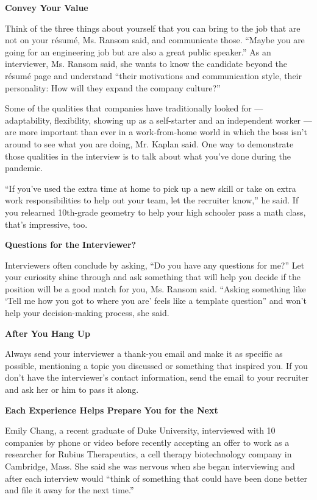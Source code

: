 \textbf{Convey Your Value}

Think of the three things about yourself that you can bring to the job
that are not on your résumé, Ms. Ransom said, and communicate those.
``Maybe you are going for an engineering job but are also a great public
speaker.'' As an interviewer, Ms. Ransom said, she wants to know the
candidate beyond the résumé page and understand ``their motivations and
communication style, their personality: How will they expand the company
culture?''

Some of the qualities that companies have traditionally looked for ---
adaptability, flexibility, showing up as a self-starter and an
independent worker --- are more important than ever in a work-from-home
world in which the boss isn't around to see what you are doing, Mr.
Kaplan said. One way to demonstrate those qualities in the interview is
to talk about what you've done during the pandemic.

``If you've used the extra time at home to pick up a new skill or take
on extra work responsibilities to help out your team, let the recruiter
know,'' he said. If you relearned 10th-grade geometry to help your high
schooler pass a math class, that's impressive, too.

\textbf{Questions for the Interviewer?}

Interviewers often conclude by asking, ``Do you have any questions for
me?'' Let your curiosity shine through and ask something that will help
you decide if the position will be a good match for you, Ms. Ransom
said. ``Asking something like `Tell me how you got to where you are'
feels like a template question'' and won't help your decision-making
process, she said.

\textbf{After You Hang Up}

Always send your interviewer a thank-you email and make it as specific
as possible, mentioning a topic you discussed or something that inspired
you. If you don't have the interviewer's contact information, send the
email to your recruiter and ask her or him to pass it along.

\textbf{Each Experience Helps Prepare You for the Next}

Emily Chang, a recent graduate of Duke University, interviewed with 10
companies by phone or video before recently accepting an offer to work
as a researcher for Rubius Therapeutics, a cell therapy biotechnology
company in Cambridge, Mass. She said she was nervous when she began
interviewing and after each interview would ``think of something that
could have been done better and file it away for the next time.''

